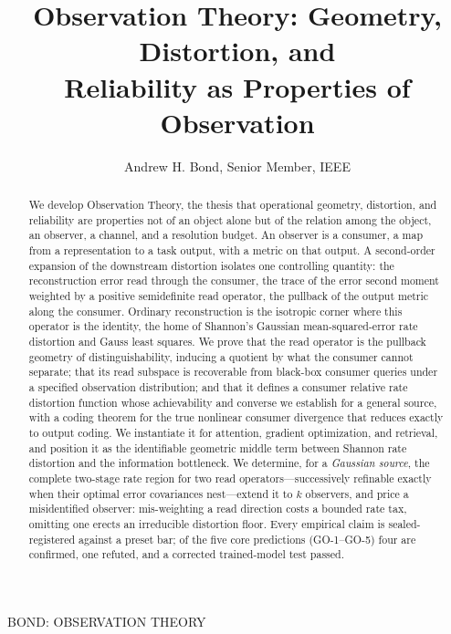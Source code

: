 \documentclass[lettersize,onecolumn]{IEEEtran}
\theoremstyle{definition}
\theoremstyle{remark}
\begin{document}
\title{Observation Theory: Geometry, Distortion, and\\ Reliability as Properties of Observation}

\author{Andrew H. Bond, Senior Member, IEEE}

%
{BOND: OBSERVATION THEORY}

\maketitle

\begin{abstract}
We develop Observation Theory, the thesis that operational geometry, distortion, and
reliability are properties not of an object alone but of the relation among the
object, an observer, a channel, and a resolution budget. An observer is a consumer, a
map from a representation to a task output, with a metric on that output. A
second-order expansion of the downstream distortion isolates one controlling quantity:
the reconstruction error read through the consumer, the trace of the error second
moment weighted by a positive semidefinite read operator, the pullback of the output
metric along the consumer. Ordinary reconstruction is the isotropic corner where this
operator is the identity, the home of Shannon's Gaussian mean-squared-error rate
distortion and Gauss least squares. We prove that the read operator
is the pullback geometry of distinguishability, inducing a quotient by what the
consumer cannot separate; that its read subspace is
recoverable from black-box consumer queries under a specified observation
distribution; and that it defines a
consumer relative rate distortion function whose achievability and converse we
establish for a general source, with a coding theorem for the true nonlinear consumer
divergence that reduces exactly to output coding. We instantiate it for
attention, gradient optimization, and retrieval, and position it as the
identifiable geometric middle term between Shannon rate distortion and the information
bottleneck. We determine, for a \emph{Gaussian source}, the complete two-stage rate region
for two read operators---successively refinable exactly when their optimal error
covariances nest---extend it to $k$ observers, and price a misidentified observer:
mis-weighting a read direction costs a bounded rate tax, omitting one erects an irreducible
distortion floor. Every empirical claim is sealed-registered against a preset bar; of the five core
predictions (GO-1--GO-5) four are confirmed, one refuted, and a corrected trained-model
test passed.
\end{abstract}
\end{document}
